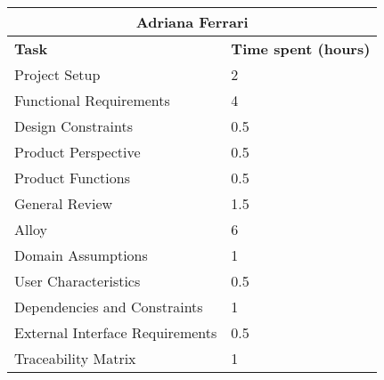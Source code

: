 \begin{table}[h]
  \center
  \begin{tabular}{l|l}
    \multicolumn{2}{c}{\textbf{Adriana Ferrari}} \\
    \hline
    \textbf{Task} & \textbf{Time spent (hours)}\\
    \hline
    Project Setup & 2 \\
    Functional Requirements & 4 \\
    Design Constraints & 0.5 \\
    Product Perspective & 0.5 \\
    Product Functions & 0.5 \\
    General Review & 1.5 \\
    Alloy & 6 \\
    Domain Assumptions & 1 \\
    User Characteristics & 0.5 \\
    Dependencies and Constraints & 1 \\
    External Interface Requirements & 0.5 \\
    Traceability Matrix & 1 \\
  \end{tabular}
\end{table}